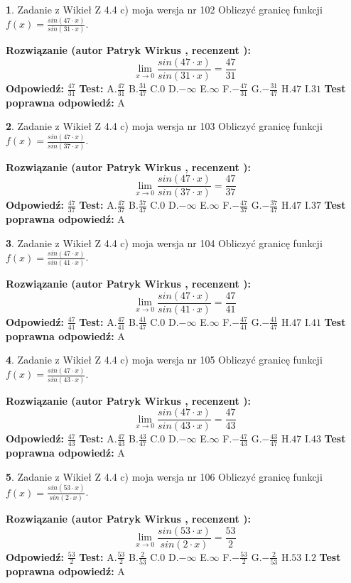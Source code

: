 \documentclass[12pt, a4paper]{article}
\theoremstyle{definition} %
\newtheorem{zad}{}
\newcommand{\zadStart}[1]{\begin{zad}#1\newline}
\newcommand{\zadStop}{\end{zad}}
\newcommand{\rozwStart}[2]{\noindent \textbf{Rozwiązanie (autor #1 , recenzent #2): }\newline}
\newcommand{\rozwStop}{\newline}
\newcommand{\odpStart}{\noindent \textbf{Odpowiedź:}\newline}
\newcommand{\odpStop}{\newline}
\newcommand{\testStart}{\noindent \textbf{Test:}\newline}
\newcommand{\testStop}{\newline}
\newcommand{\kluczStart}{\noindent \textbf{Test poprawna odpowiedź:}\newline}
\newcommand{\kluczStop}{\newline}
\begin{document}
\zadStart{Zadanie z Wikieł Z 4.4 c) moja wersja nr 102}
Obliczyć granicę funkcji $f(x)=\frac{sin(47\cdot x)}{sin(31\cdot x)}$.
\zadStop
\rozwStart{Patryk Wirkus}{}
$$\lim\limits_{x\to 0}\frac{sin(47\cdot x)}{sin(31\cdot x)}=
\frac{47}{31}$$
\rozwStop
\odpStart
$\frac{47}{31}$
\odpStop
\testStart
A.$\frac{47}{31}$
B.$\frac{31}{47}$
C.$0$
D.$-\infty$
E.$\infty$
F.$-\frac{47}{31}$
G.$-\frac{31}{47}$
H.$47$
I.$31$
\testStop
\kluczStart
A
\kluczStop



\zadStart{Zadanie z Wikieł Z 4.4 c) moja wersja nr 103}
Obliczyć granicę funkcji $f(x)=\frac{sin(47\cdot x)}{sin(37\cdot x)}$.
\zadStop
\rozwStart{Patryk Wirkus}{}
$$\lim\limits_{x\to 0}\frac{sin(47\cdot x)}{sin(37\cdot x)}=
\frac{47}{37}$$
\rozwStop
\odpStart
$\frac{47}{37}$
\odpStop
\testStart
A.$\frac{47}{37}$
B.$\frac{37}{47}$
C.$0$
D.$-\infty$
E.$\infty$
F.$-\frac{47}{37}$
G.$-\frac{37}{47}$
H.$47$
I.$37$
\testStop
\kluczStart
A
\kluczStop



\zadStart{Zadanie z Wikieł Z 4.4 c) moja wersja nr 104}
Obliczyć granicę funkcji $f(x)=\frac{sin(47\cdot x)}{sin(41\cdot x)}$.
\zadStop
\rozwStart{Patryk Wirkus}{}
$$\lim\limits_{x\to 0}\frac{sin(47\cdot x)}{sin(41\cdot x)}=
\frac{47}{41}$$
\rozwStop
\odpStart
$\frac{47}{41}$
\odpStop
\testStart
A.$\frac{47}{41}$
B.$\frac{41}{47}$
C.$0$
D.$-\infty$
E.$\infty$
F.$-\frac{47}{41}$
G.$-\frac{41}{47}$
H.$47$
I.$41$
\testStop
\kluczStart
A
\kluczStop



\zadStart{Zadanie z Wikieł Z 4.4 c) moja wersja nr 105}
Obliczyć granicę funkcji $f(x)=\frac{sin(47\cdot x)}{sin(43\cdot x)}$.
\zadStop
\rozwStart{Patryk Wirkus}{}
$$\lim\limits_{x\to 0}\frac{sin(47\cdot x)}{sin(43\cdot x)}=
\frac{47}{43}$$
\rozwStop
\odpStart
$\frac{47}{43}$
\odpStop
\testStart
A.$\frac{47}{43}$
B.$\frac{43}{47}$
C.$0$
D.$-\infty$
E.$\infty$
F.$-\frac{47}{43}$
G.$-\frac{43}{47}$
H.$47$
I.$43$
\testStop
\kluczStart
A
\kluczStop



\zadStart{Zadanie z Wikieł Z 4.4 c) moja wersja nr 106}
Obliczyć granicę funkcji $f(x)=\frac{sin(53\cdot x)}{sin(2\cdot x)}$.
\zadStop
\rozwStart{Patryk Wirkus}{}
$$\lim\limits_{x\to 0}\frac{sin(53\cdot x)}{sin(2\cdot x)}=
\frac{53}{2}$$
\rozwStop
\odpStart
$\frac{53}{2}$
\odpStop
\testStart
A.$\frac{53}{2}$
B.$\frac{2}{53}$
C.$0$
D.$-\infty$
E.$\infty$
F.$-\frac{53}{2}$
G.$-\frac{2}{53}$
H.$53$
I.$2$
\testStop
\kluczStart
A
\kluczStop
\end{document}
